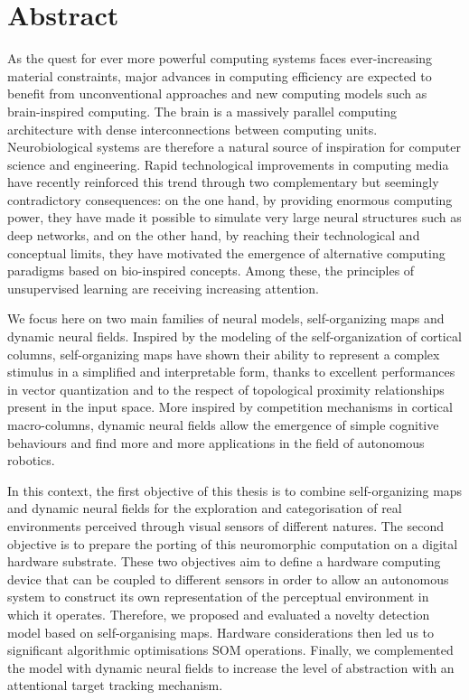 \chapter*{Abstract}
\markboth{}{}

As the quest for ever more powerful computing systems faces ever-increasing material constraints, major advances in computing efficiency are expected to benefit from unconventional approaches and new computing models such as brain-inspired computing. The brain is a massively parallel computing architecture with dense interconnections between computing units. Neurobiological systems are therefore a natural source of inspiration for computer science and engineering. Rapid technological improvements in computing media have recently reinforced this trend through two complementary but seemingly contradictory consequences: on the one hand, by providing enormous computing power, they have made it possible to simulate very large neural structures such as deep networks, and on the other hand, by reaching their technological and conceptual limits, they have motivated the emergence of alternative computing paradigms based on bio-inspired concepts. Among these, the principles of unsupervised learning are receiving increasing attention.

We focus here on two main families of neural models, self-organizing maps and dynamic neural fields. Inspired by the modeling of the self-organization of cortical columns, self-organizing maps have shown their ability to represent a complex stimulus in a simplified and interpretable form, thanks to excellent performances in vector quantization and to the respect of topological proximity relationships present in the input space. More inspired by competition mechanisms in cortical macro-columns, dynamic neural fields allow the emergence of simple cognitive behaviours and find more and more applications in the field of autonomous robotics.

In this context, the first objective of this thesis is to combine self-organizing maps and dynamic neural fields for the exploration and categorisation of real environments perceived through visual sensors of different natures. The second objective is to prepare the porting of this neuromorphic computation on a digital hardware substrate. These two objectives aim to define a hardware computing device that can be coupled to different sensors in order to allow an autonomous system to construct its own representation of the perceptual environment in which it operates. Therefore, we proposed and evaluated a novelty detection model based on self-organising maps. Hardware considerations then led us to significant algorithmic optimisations SOM operations. Finally, we complemented the model with dynamic neural fields to increase the level of abstraction with an attentional target tracking mechanism.